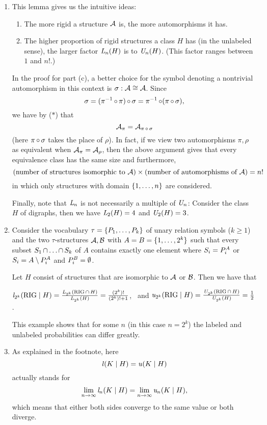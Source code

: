 \begin{enumerate}[1.]
%
\item {} This lemma gives us the intuitive ideas:
\begin{enumerate}[\rm(1)]
\item The more rigid a structure $\mathcal{A}$ is, the more automorphisms it has.
\item The higher proportion of rigid structures a class $H$ has (in the unlabeled sense), the larger factor $\mathit{L}_{n}(H)$ is to $\mathit{U}_{n}(H)$. (This factor ranges between $1$ and $n!$.)
\end{enumerate}

In the proof for part (c), a better choice for the symbol denoting a nontrivial automorphism in this context is $\sigma : \strct{A} \isom \strct{A}$. Since
\[
\sigma = (\pi^{-1} \mathop{\circ} \pi) \mathop{\circ} \sigma = \pi^{-1} \mathop{\circ} (\pi \mathop{\circ} \sigma),
\]
we have by ($\ast$) that
\[
\mathcal{A}_\pi = \mathcal{A}_{\pi \mathop{\circ} \sigma}
\]
(here $\pi \mathop{\circ} \sigma$ takes the place of $\rho$). In fact, if we view two automorphisms $\pi, \rho$ as equivalent when $\mathcal{A}_\pi = \mathcal{A}_\rho$, then the above argument gives that every equivalence class has the same size and furthermore,
\[
(\text{number of structures isomorphic to \mathmode{\strct{A}}}) \times (\text{number of automorphisms of \mathmode{\strct{A}}}) = n!
\]
in which only structures with domain ${\{1, \ldots, n\}}$ are considered.

Finally, note that $\mathit{L}_{n}$ is not necessarily a multiple of $\mathit{U}_{n}$: Consider the class $H$ of digraphs, then we have $\mathit{L}_{2}(H) = 4$ and $\mathit{U}_{2}(H) = 3$.
%
\item {} Consider the vocabulary $\tau = {\{P_1, \ldots, P_k\}}$ of unary relation symbols ($k \geq 1$) and the two $\tau$-structures $\mathcal{A}, \mathcal{B}$ with $A = B = {\{1, \ldots, 2^k\}}$ such that every subset $S_1 \mathop{\cap} \ldots \mathop{\cap} S_k$ of $A$ contains exactly one element where $S_i = P_i^{A}$ or $S_i = A \setminus P_i^{A}$ and $P_i^{B} = \emptyset$.

Let $H$ consist of structures that are isomorphic to $\mathcal{A}$ or $\mathcal{B}$. Then we have that
\begin{center}
$\lprob[2^k](\rigid \wrt H) = \frac{\lclass{2^k}(\rigid \intsc H)}{\lclass{2^k}(H)} = \frac{(2^k)!}{(2^k)! + 1}$, \ and $\uprob[2^k](\rigid \wrt H) = \frac{\uclass{2^k}(\rigid \intsc H)}{\uclass{2^k}(H)} = \frac{1}{2}$.
\end{center}

This example shows that for some $n$ (in this case $n = 2^k$) the labeled and unlabeled probabilities can differ greatly.
%
\item {} As explained in the footnote, here
\[
\lprob(K \wrt H) = \uprob(K \wrt H)
\]
actually stands for
\[
\lim_{n \to \infty} \lprob[n](K \wrt H) = \lim_{n \to \infty} \uprob[n](K \wrt H),
\]
which means that either both sides converge to the same value or both diverge.


\end{enumerate}
